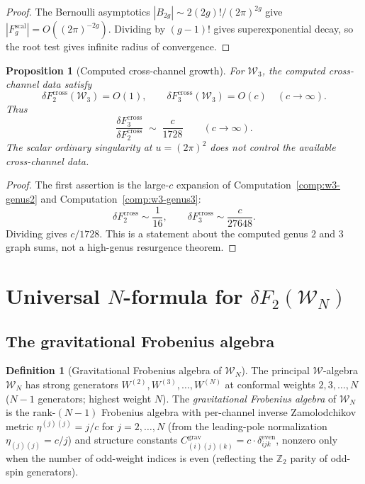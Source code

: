 \documentclass[11pt]{article}
\newtheorem{proposition}[theorem]{Proposition}
\theoremstyle{definition}
\newtheorem{definition}[theorem]{Definition}
\theoremstyle{remark}
\newcommand{\Walg}{\mathcal{W}}
\newcommand{\cross}{\mathrm{cross}}
\newcommand{\scal}{\mathrm{scal}}
\newcommand{\grav}{\mathrm{grav}}
\numberwithin{equation}{section}
\begin{document}
\begin{proof}
The Bernoulli asymptotics
\(|B_{2g}|\sim 2(2g)!/(2\pi)^{2g}\) give
\(|F_g^{\scal}|=O((2\pi)^{-2g})\). Dividing by \((g-1)!\) gives
superexponential decay, so the root test gives infinite radius of
convergence.
\end{proof}

\begin{proposition}[Computed cross-channel growth]\label{prop:instanton-hierarchy}
For \(\Walg_3\), the computed cross-channel data satisfy
\[
\delta F_2^{\cross}(\Walg_3)=O(1),\qquad
\delta F_3^{\cross}(\Walg_3)=O(c)
\quad(c\to\infty).
\]
Thus
\[
 \frac{\delta F_3^{\cross}}{\delta F_2^{\cross}}
 \;\sim\;
 \frac{c}{1728}
 \qquad(c\to\infty).
\]
The scalar ordinary singularity at \(u=(2\pi)^2\) does not control the
available cross-channel data.
\end{proposition}

\begin{proof}
The first assertion is the large-\(c\) expansion of
Computation~\ref{comp:w3-genus2} and
Computation~\ref{comp:w3-genus3}:
\[
\delta F_2^{\cross}\sim \frac1{16},\qquad
\delta F_3^{\cross}\sim \frac{c}{27648}.
\]
Dividing gives \(c/1728\). This is a statement about the computed
genus \(2\) and \(3\) graph sums, not a high-genus resurgence theorem.
\end{proof}


\section{Universal $N$-formula for
$\delta F_2(\Walg_N)$}\label{sec:universal-N}

\subsection{The gravitational Frobenius algebra}

\begin{definition}[Gravitational Frobenius algebra of $\Walg_N$]\label{def:grav-frobenius}
The principal $\Walg$-algebra $\Walg_N$ has strong generators
$W^{(2)}, W^{(3)}, \ldots, W^{(N)}$ at conformal weights
$2, 3, \ldots, N$ ($N{-}1$ generators; highest weight $N$).
The \emph{gravitational Frobenius algebra} of $\Walg_N$ is
the rank-$(N{-}1)$ Frobenius algebra with
per-channel inverse Zamolodchikov metric
$\eta^{(j)(j)} = j/c$ for $j = 2, \ldots, N$
(from the leading-pole normalization $\eta_{(j)(j)} = c/j$)
and structure constants
$C^{\grav}_{(i)(j)(k)} = c \cdot \delta_{ijk}^{\mathrm{even}}$,
nonzero only when the number of odd-weight indices is even
(reflecting the $\mathbb{Z}_2$ parity of odd-spin generators).
\end{definition}
\end{document}
